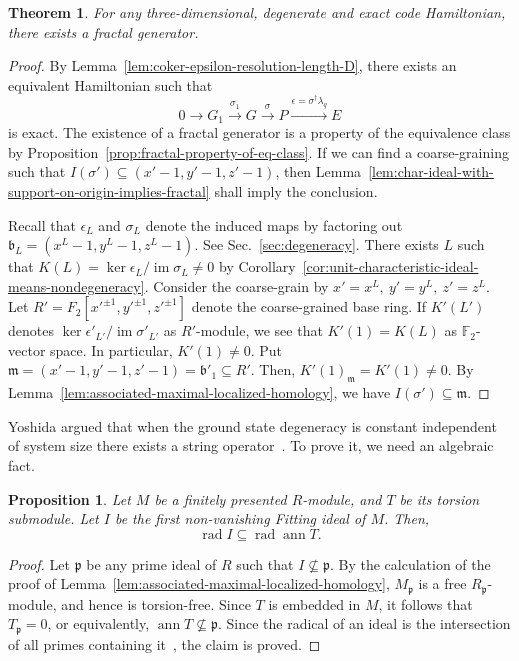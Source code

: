 \documentclass[letterpaper,12pt]{amsart}
\newtheorem{theorem}{Theorem}
\newtheorem{prop}[lem]{Proposition}
\theoremstyle{definition} \newtheorem{defn}{Definition}
\theoremstyle{definition} \newtheorem{rem}{Remark}
\theoremstyle{definition} \newtheorem{example}{Example}
\newcommand{\im}{\mathop{\mathrm{im}}}
\newcommand{\ann}{\mathop{\mathrm{ann}}}
\newcommand{\rad}{\mathop{\mathrm{rad}}}
\newcommand{\FF}{\mathbb{F}}
\newcommand{\mm}{\mathfrak{m}}
\newcommand{\pp}{\mathfrak{p}}
\newcommand{\bb}{\mathfrak{b}}
\begin{document}
\begin{theorem}
For any three-dimensional, degenerate and exact code Hamiltonian,
there exists a fractal generator.
\label{thm:fractal-exists-in-3D}
\end{theorem}
\begin{proof}
By Lemma~\ref{lem:coker-epsilon-resolution-length-D}, there exists an equivalent Hamiltonian
such that
\[
  0 \to G_1 \xrightarrow{\sigma_1} G \xrightarrow{\sigma} P \xrightarrow{\epsilon=\sigma^\dagger \lambda_q} E
\]
is exact. The existence of a fractal generator is a property of the equivalence class
by Proposition~\ref{prop:fractal-property-of-eq-class}.
If we can find a coarse-graining such that $I(\sigma') \subseteq (x'-1,y'-1,z'-1)$,
then Lemma~\ref{lem:char-ideal-with-support-on-origin-implies-fractal} shall imply the conclusion.


Recall that $\epsilon_L$ and $\sigma_L$ denote the induced maps
by factoring out $\bb_L = (x^L-1,y^L-1,z^L-1)$. See Sec.~\ref{sec:degeneracy}.
There exists $L$ such that $K(L) = \ker \epsilon_L / \im \sigma_L \ne 0$ by 
Corollary~\ref{cor:unit-characteristic-ideal-means-nondegeneracy}.
Consider the coarse-grain by $x'=x^L,~ y'=y^L,~ z'=z^L$.
Let $R' = F_2[x'^{\pm 1}, y'^{\pm 1}, z'^{\pm 1}]$ denote the coarse-grained base ring.
If $K'(L')$ denotes $\ker \epsilon'_{L'} / \im \sigma'_{L'}$ as $R'$-module,
we see that $K'(1) = K(L)$ as $\FF_2$-vector space.
In particular, $K'(1) \ne 0$.
Put $\mm = (x'-1,y'-1,z'-1) = \bb'_1 \subseteq R'$.
Then, $K'(1)_{\mm} = K'(1) \ne 0$.
By Lemma~\ref{lem:associated-maximal-localized-homology},
we have $I(\sigma') \subseteq \mm$.
\end{proof}

Yoshida argued that when the ground state degeneracy is constant independent of system size
there exists a string operator~\cite{Yoshida2011feasibility}.
To prove it, we need an algebraic fact.
\begin{prop}
Let $M$ be a finitely presented $R$-module, and $T$ be its torsion submodule.
Let $I$ be the first non-vanishing Fitting ideal of $M$.
Then,
\[
 \rad I \subseteq \rad \ann T .
\]
\label{prop:support-torsion-fitting-ideal}
\end{prop}
\begin{proof}
Let $\pp$ be any prime ideal of $R$ such that $I \not\subseteq \pp$.
By the calculation of the proof of Lemma~\ref{lem:associated-maximal-localized-homology},
$M_\pp$ is a free $R_\pp$-module, and hence is torsion-free.
Since $T$ is embedded in $M$, it follows that $T_\pp = 0$, or equivalently, $\ann T \not\subseteq \pp$.
Since the radical of an ideal is the intersection of all primes containing it~\cite[Proposition 1.8]{AtiyahMacDonald},
the claim is proved.
\end{proof}
\end{document}
